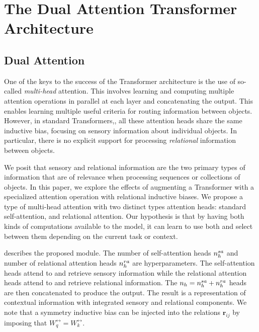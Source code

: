 \section{The Dual Attention Transformer Architecture}

\subsection{Dual Attention}

One of the keys to the success of the Transformer architecture is the use of so-called \textit{multi-head} attention. This involves learning and computing multiple attention operations in parallel at each layer and concatenating the output. This enables learning multiple useful criteria for routing information between objects. However, in standard Transformers,, all these attention heads share the same inductive bias, focusing on sensory information about individual objects. 
In particular, there is no explicit support for processing \textit{relational} information between objects.

We posit that sensory and relational information are the two primary types of information that are of relevance when processing sequences or collections of objects. 
In this paper, we explore the effects of augmenting a Transformer with a specialized attention operation with relational inductive biases. We propose a type of multi-head attention with two distinct types attention heads: standard self-attention, and relational attention. Our hypothesis is that by having both kinds of computations available to the model, it can learn to use both and select between them depending on the current task or context.

 describes the proposed module. The number of self-attention heads $n_h^{sa}$ and number of relational attention heads $n_h^{ra}$ are hyperparameters. The self-attention heads attend to and retrieve sensory information while the relational attention heads attend to and retrieve relational information. The $n_h = n_h^{sa} + n_h^{ra}$ heads are then concatenated to produce the output. The result is a representation of contextual information with integrated sensory and relational components. We note that a symmetry inductive bias can be injected into the relations $\bm{r}_{ij}$ by imposing that $W_{q}^{\rel} = W_k^{\rel}$.

